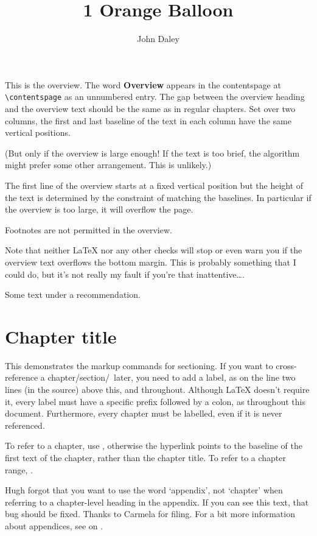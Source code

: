 \documentclass{grattan}
\author{John Daley}
\title{1 Orange Balloon}
\begin{document}
\begin{overview}
This is the overview. 
The word \textbf{Overview} appears in the contentspage at \verb=\contentspage= as an unnumbered entry.
The gap between the overview heading and the overview text should be the same as in regular chapters. 
Set over two columns, the first and last baseline of the text in each column have the same vertical positions.

(But only if the overview is large enough!
If the text is too brief, the algorithm might prefer some other arrangement.
This is unlikely.) 

The first line of the overview starts at a fixed vertical position but the height of the text is determined by the constraint of matching the baselines.
In particular if the overview is too large, it will overflow the page.

Footnotes are not permitted in the overview.

Note that neither \LaTeX{} nor any other checks will stop or even warn you if the overview text overflows the bottom margin.
This is probably something that I could do, but it's not really my fault if you're that inattentive\dots . 
\end{overview}

\begin{recommendations}
\label{rec:use-labels}
Some text under a recommendation.
\end{recommendations}

\contentspage

\chapter{Chapter title}\label{chap:example}
This demonstrates the markup commands for sectioning. 
If you want to cross-reference a chapter/section/\etc\ later, you need to add a label, as on the line two lines (in the source) above this, and throughout.
Although \LaTeX{} doesn't require it, every label must have a specific prefix followed by a colon, as throughout this document.
Furthermore, every chapter must be labelled, even if it is never referenced.

To refer to a chapter, use , %
otherwise the hyperlink points to the baseline of the first text of the chapter, rather than the chapter title.
To refer to a chapter range, .

Hugh forgot that you want to use the word `appendix', not `chapter' when referring to a chapter-level heading in the appendix.
If you can see this text, that bug should be fixed.
Thanks to Carmela for filing. 
For a bit more information about appendices, see  on . 
\end{document}
